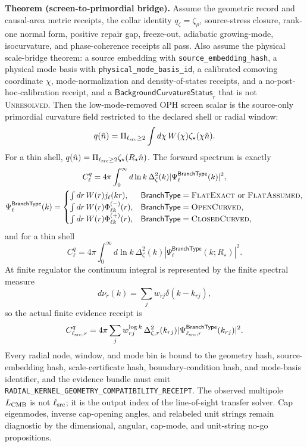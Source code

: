 \textbf{Theorem (screen-to-primordial bridge).}\label{thm:oph-screen-to-primordial}
Assume the geometric record and causal-area metric receipts, the collar
identity \(q_\zeta=\zeta_\rho\), source-stress closure, rank-one normal form,
positive repair gap, freeze-out, adiabatic growing-mode, isocurvature, and
phase-coherence receipts all pass.  Also assume the physical scale-bridge theorem: a source embedding with
\texttt{source\_embedding\_hash}, a physical mode basis with
\texttt{physical\_mode\_basis\_id}, a calibrated comoving coordinate \(\chi\),
mode-normalization and density-of-states receipts, and a no-post-hoc-calibration
receipt, and a \(\mathsf{BackgroundCurvatureStatus}_r\) that is not \textsc{Unresolved}.  Then the low-mode-removed OPH screen
scalar is the source-only primordial curvature field restricted to the
declared shell or radial window:
\[
q(\hat n)=
\Pi_{\ell_{\rm src}\ge2}\int d\chi\,W(\chi)\zeta_\star(\chi\hat n).
\]
For a thin shell, \(q(\hat n)=\Pi_{\ell_{\rm src}\ge2}\zeta_\star(R_\star\hat n)\).  The
forward spectrum is exactly
\[
\begin{gathered}
C_\ell^q
=
4\pi\int_0^\infty d\ln k\,
\Delta_\zeta^2(k)|\Psi_\ell^{\mathsf{BranchType}}(k)|^2,\\
\Psi_\ell^{\mathsf{BranchType}}(k)=
\begin{cases}
\int dr\,W(r)j_\ell(kr), & \mathsf{BranchType}=\textsc{FlatExact}\ \hbox{or}\ \textsc{FlatAssumed},\\
\int dr\,W(r)\Phi^{(-)}_{\ell k}(r), & \mathsf{BranchType}=\textsc{OpenCurved},\\
\int dr\,W(r)\Phi^{(+)}_{\ell k}(r), & \mathsf{BranchType}=\textsc{ClosedCurved},
\end{cases}
\end{gathered}
\]
and for a thin shell
\[
C_\ell^q
=
4\pi\int_0^\infty d\ln k\,
\Delta_\zeta^2(k)
\left|\Psi_\ell^{\mathsf{BranchType}}(k;R_\star)\right|^2 .
\]
At finite regulator the continuum integral is represented by the finite
spectral measure
\[
d\nu_r(k)=\sum_j w_{rj}\delta(k-k_{rj}),
\]
so the actual finite evidence receipt is
\[
C_{\ell_{\rm src},r}^q
=4\pi\sum_j w^{\log k}_{rj}\,
\Delta_{\zeta,r}^2(k_{rj})
|\Psi^{\mathsf{BranchType}}_{\ell_{\rm src},r}(k_{rj})|^2.
\]
Every radial node, window, and mode bin is bound to the geometry hash,
source-embedding hash, scale-certificate hash, boundary-condition hash, and
mode-basis identifier, and the evidence bundle must emit
\texttt{RADIAL\_KERNEL\_GEOMETRY\_COMPATIBILITY\_RECEIPT}.  The observed multipole \(L_{\rm CMB}\) is not
\(\ell_{\rm src}\); it is the output index of the line-of-sight transfer solver.
Cap eigenmodes, inverse cap-opening angles, and relabeled unit strings remain
diagnostic by the dimensional, angular, cap-mode, and unit-string no-go propositions.

